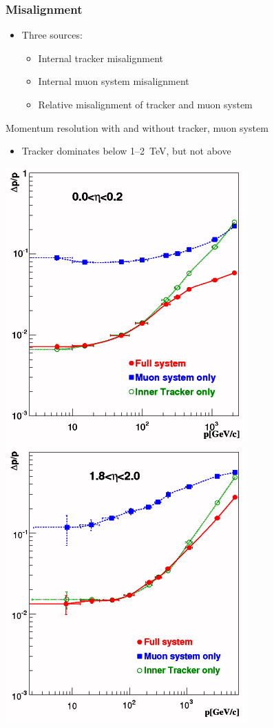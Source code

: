 \documentclass[compress]{beamer}
\begin{document}
\begin{frame}
\frametitle{Misalignment}

\vfill
\begin{itemize}
\item Three sources:
\begin{itemize}
\item Internal tracker misalignment
\item Internal muon system misalignment
\item Relative misalignment of tracker and muon system
\end{itemize}
\end{itemize}

Momentum resolution with and without tracker, muon system
\begin{itemize}
\item Tracker dominates below 1--2~TeV, but not above
\end{itemize}
\begin{center}
\includegraphics[width=0.4\linewidth]{Figure_001-005-a.png} \includegraphics[width=0.4\linewidth]{Figure_001-005-b.png}
\end{center}
\end{frame}
\end{document}
